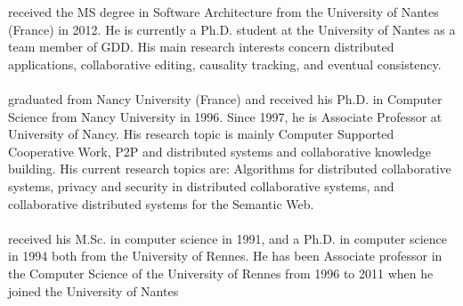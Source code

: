 
received the MS degree in Software Architecture from the University of Nantes
(France) in 2012. He is currently a Ph.D. student at the University of Nantes as
a team member of GDD. His main research interests concern distributed
applications, collaborative editing, causality tracking, and eventual
consistency.
\ \\ \ \\
graduated from Nancy University (France) and received his Ph.D. in Computer
Science from Nancy University in 1996. Since 1997, he is Associate Professor at
University of Nancy. His research topic is mainly Computer Supported Cooperative
Work, P2P and distributed systems and collaborative knowledge building. His
current research topics are: Algorithms for distributed collaborative systems,
privacy and security in distributed collaborative systems, and collaborative
distributed systems for the Semantic Web.
\\ \ \\
 received his M.Sc.  in computer science in
1991, and a Ph.D. in computer science in 1994 both from the University of
Rennes. He has been Associate professor in the Computer Science of the
University of Rennes from 1996 to 2011 when he joined the University of Nantes
